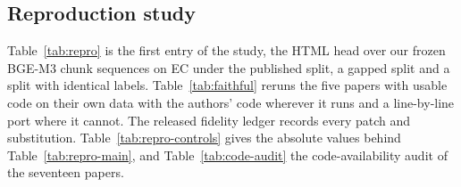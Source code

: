 \subsection{Reproduction study}
\label{app:repro}
Table~\ref{tab:repro} is the first entry of the study, the HTML head over our
frozen BGE-M3 chunk sequences on EC under the published split, a gapped split and
a \tickerdisjoint{} split with identical labels. Table~\ref{tab:faithful} reruns
the five papers with usable code on their own data with the authors' code wherever
it runs and a line-by-line port where it cannot. The released fidelity ledger
records every patch and substitution. Table~\ref{tab:repro-controls} gives the
absolute values behind Table~\ref{tab:repro-main}, and Table~\ref{tab:code-audit}
the code-availability audit of the seventeen papers.

